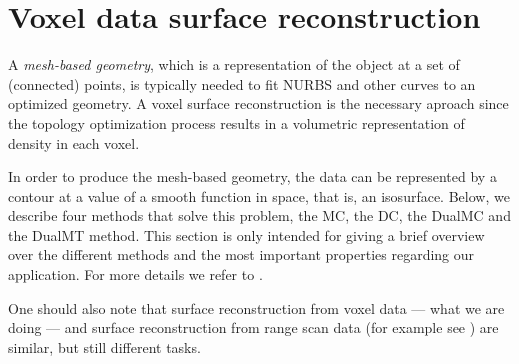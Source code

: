 \section{Voxel data surface reconstruction}
\label{sec:surfaceBackg}
A \emph{mesh-based geometry}, which is a representation of the object at a set of (connected) points, is typically needed to fit \ac{NURBS} and other curves to an optimized geometry. A voxel surface reconstruction is the necessary aproach since the topology optimization process results in a volumetric representation of density in each voxel. 

In order to produce the mesh-based geometry, the data can be represented by a contour at a value of a smooth function in space, that is, an isosurface. Below, we describe four methods that solve this problem, the \acl{MC}, the \acl{DC}, the \acl{DualMC} and the \acl{DualMT} method. This section is only intended for giving a brief overview over the different methods and the most important properties regarding our application. For more details we refer to \cite{Marching2006, Hermite2002, Nielson2004, Nielson2008}. 

 One should also note that surface reconstruction from voxel data --- what we are doing --- and surface reconstruction from range scan data (for example see ) are similar, but still different tasks.






